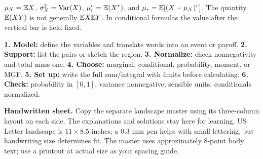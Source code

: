 $\mu_X=\mathbb E X$, $\sigma_X^2=\operatorname{Var}(X)$, $\mu'_r=\mathbb E(X^r)$, and $\mu_r=\mathbb E[(X-\mu_X)^r]$. The quantity $\mathbb E(XY)$ is not generally $\mathbb E X\mathbb E Y$. In conditional formulas the value after the vertical bar is held fixed.

\begin{insight}
\textbf{1. Model:} define the variables and translate words into an event or payoff.\quad
\textbf{2. Support:} list the pairs or sketch the region.\quad
\textbf{3. Normalize:} check nonnegativity and total mass one.\quad
\textbf{4. Choose:} marginal, conditional, probability, moment, or MGF.\quad
\textbf{5. Set up:} write the full sum/integral with limits before calculating.\quad
\textbf{6. Check:} probability in $[0,1]$, variance nonnegative, sensible units, conditionals normalized.
\end{insight}

\textbf{Handwritten sheet.} Copy the separate landscape master using its three-column layout on each side. The explanations and solutions stay here for learning. US Letter landscape is $11\times8.5$ inches; a 0.3 mm pen helps with small lettering, but handwriting size determines fit. The master uses approximately 8-point body text; use a printout at actual size as your spacing guide.
